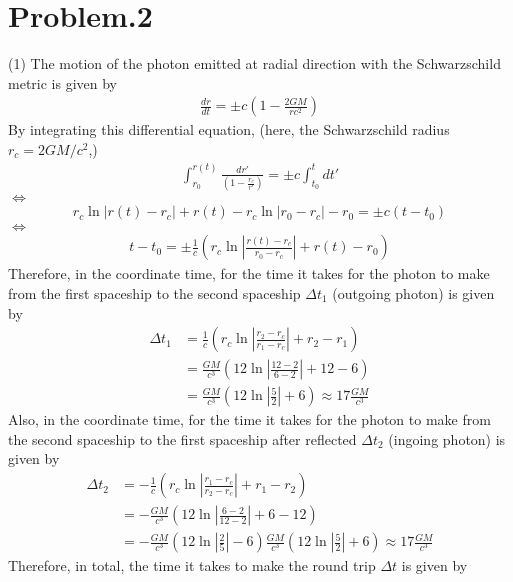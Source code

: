\documentclass[12pt]{article}
\begin{document}
\section*{Problem.2}
(1)
The motion of the photon emitted at radial direction with the Schwarzschild metric is given by
\begin{align*}
\frac{d r}{d t} = \pm c \left(1 - \frac{2 G M}{r c^2}\right)
\end{align*}
By integrating this differential equation, (here, the Schwarzschild radius $r_c = 2 G M / c^2$,)
\begin{align*}
\int_{r_0}^{r(t)} \frac{d r'}{\left(1 - \frac{r_c}{r'}\right)} = \pm c  \int_{t_0}^{t} dt'
\end{align*}
$\Leftrightarrow$
\begin{align*}
r_c \ln{|r(t) - r_c|} + r(t) - r_c \ln{|r_0 - r_c|} - r_0  = \pm c \left(t - t_0\right)
\end{align*}
$\Leftrightarrow$
\begin{align*}
t - t_0 = \pm \frac{1}{c} \left(r_c \ln{\left| \frac{r(t) - r_c}{r_0 - r_c}\right|} + r(t) - r_0 \right)
\end{align*}
Therefore, in the coordinate time, for the time it takes for the photon to make from the first spaceship to the second spaceship $\Delta t_1$ (outgoing photon) is given by 
\begin{align*}
\Delta t_1 &= \frac{1}{c} \left(r_c \ln{\left| \frac{r_2 - r_c}{r_1 - r_c}\right|} + r_2 - r_1 \right)\\[1em]
&= \frac{G M}{c^3} \left(12 \ln{\left| \frac{12 - 2}{6 - 2}\right|} + 12 - 6 \right)\\[1em]
&= \frac{G M}{c^3} \left(12 \ln{\left| \frac{5}{2}\right|} + 6 \right) \approx 17 \frac{G M}{c^3}
\end{align*}
Also, in the coordinate time, for the time it takes for the photon to make from the second spaceship to the first spaceship after reflected $\Delta t_2$ (ingoing photon) is given by
\begin{align*}
\Delta t_2 &= - \frac{1}{c} \left(r_c \ln{\left| \frac{r_1 - r_c}{r_2 - r_c}\right|} + r_1 - r_2 \right)\\[1em]
&= - \frac{G M}{c^3} \left(12 \ln{\left| \frac{6 - 2}{12 - 2}\right|} + 6 - 12 \right)\\[1em]
&= - \frac{G M}{c^3} \left(12 \ln{\left| \frac{2}{5}\right|} - 6 \right) \frac{G M}{c^3} \left(12 \ln{\left| \frac{5}{2}\right|} + 6 \right) \approx 17 \frac{G M}{c^3}
\end{align*}
Therefore, in total, the time it takes to make the round trip $\Delta t$ is given by
\end{document}
